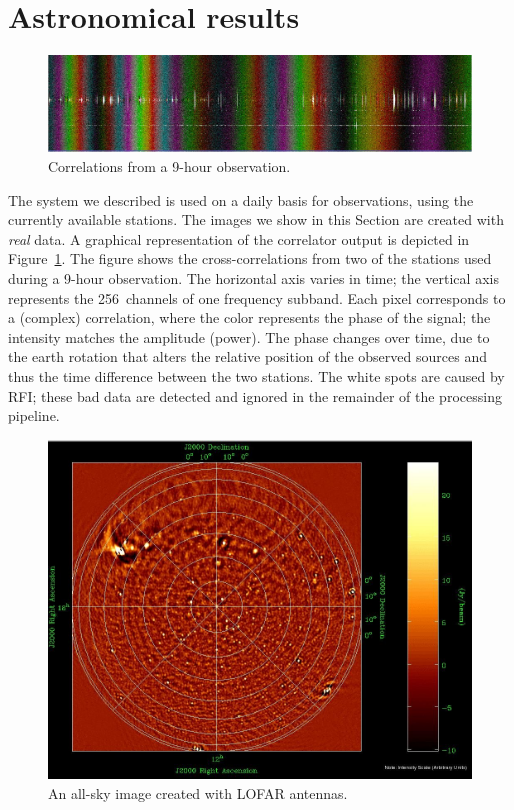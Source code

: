 \documentclass{sig-alternate}
\begin{document}
\section{Astronomical results}
\label{sec:results}

\begin{figure}[ht]
\includegraphics[width=\columnwidth]{fringe.jpg}
\caption{Correlations from a 9-hour observation.}
\label{fig:fringe}
\end{figure}

The system we described is used on a daily basis for observations, using the currently
available stations. The images we show in this Section are created with \emph{real} data.
A graphical representation of the correlator output is depicted in
Figure~\ref{fig:fringe}.
The figure shows the cross-correlations from two of the stations used during a 9-hour
observation.
The horizontal axis varies in time;
the vertical axis represents the 256~channels of one frequency subband.
Each pixel corresponds to a (complex) correlation, where the color represents
the phase of the signal; the intensity matches the amplitude (power).
The phase changes over time, due to the earth rotation that alters the
relative position of the observed sources and thus the time difference
between the two stations.
The white spots are caused by RFI; these bad data are detected and
ignored in the remainder of the processing pipeline.

\begin{figure}[ht]
\includegraphics[width=\columnwidth]{all-sky-image.jpg}
\caption{An all-sky image created with LOFAR antennas.}
\label{fig:all-sky-image}
\end{figure}
\end{document}
